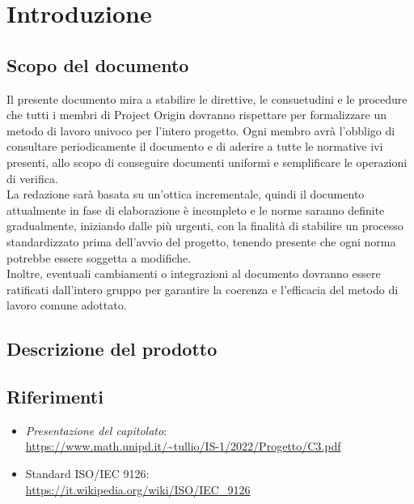 \section{Introduzione}

\subsection{Scopo del documento}
Il presente documento mira a stabilire le direttive, le consuetudini e le procedure che tutti i membri di Project Origin dovranno rispettare per formalizzare un metodo di lavoro 
univoco per l'intero progetto. Ogni membro avrà l'obbligo di consultare periodicamente il documento e di aderire a tutte le normative ivi presenti, allo scopo di conseguire 
documenti uniformi e semplificare le operazioni di verifica. \\ La redazione sarà basata su un'ottica incrementale, quindi il documento attualmente in fase di elaborazione è 
incompleto e le norme saranno definite gradualmente, iniziando dalle più urgenti, con la finalità di stabilire un processo standardizzato prima dell'avvio del progetto, 
tenendo presente che ogni norma potrebbe essere soggetta a modifiche. \\ Inoltre, eventuali cambiamenti o integrazioni al documento dovranno essere ratificati dall’intero 
gruppo per garantire la coerenza e l'efficacia del metodo di lavoro comune adottato.


\subsection{Descrizione del prodotto}

\subsection{Riferimenti}
\begin{itemize}
    \item \textit{Presentazione del capitolato}: \\ \url{https://www.math.unipd.it/~tullio/IS-1/2022/Progetto/C3.pdf}
    \item Standard ISO/IEC 9126: \\ \url{https://it.wikipedia.org/wiki/ISO/IEC_9126}  
\end{itemize}
